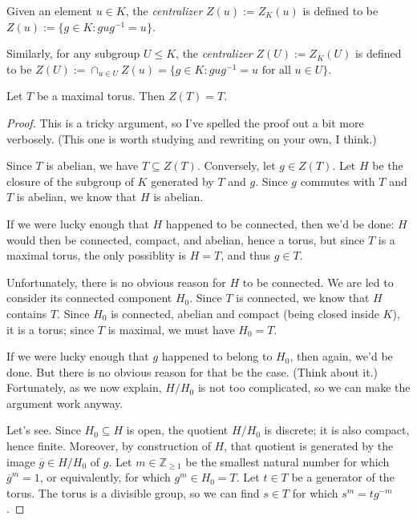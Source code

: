 \documentclass[reqno]{amsart} 
\begin{document}
\begin{definition}
  Given an element $u \in K$, the \emph{centralizer} $Z(u) := Z_K(u)$ is defined to be $Z(u) := \{g \in K : g u g^{-1} = u\}$.

  Similarly, for any subgroup $U \leq K$, the \emph{centralizer} $Z(U) := Z_K(U)$ is defined to be $Z(U) := \cap_{u \in U} Z(u) = \{g \in K : g u g^{-1} = u \text{ for all } u \in U\}$.
\end{definition}

\begin{lemma}
  Let $T$ be a maximal torus.  Then $Z(T) = T$.
\end{lemma}
\begin{proof}
  This is a tricky argument, so I've spelled the proof out a bit more verbosely.  (This one is worth studying and rewriting on your own, I think.)

  Since $T$ is abelian, we have $T \subseteq Z(T)$.  Conversely, let $g \in Z(T)$.  Let $H$ be the closure of the subgroup of $K$ generated by $T$ and $g$.  Since $g$ commutes with $T$ and $T$ is abelian, we know that $H$ is abelian.

  If we were lucky enough that $H$ happened to be connected, then we'd be done: $H$ would then be connected, compact, and abelian, hence a torus, but since $T$ is a maximal torus, the only possiblity is $H = T$, and thus $g \in T$.

  Unfortunately, there is no obvious reason for $H$ to be connected.  We are led to consider its connected component $H_0$.  Since $T$ is connected, we know that $H$ contains $T$.  Since $H_0$ is connected, abelian and compact (being closed inside $K$), it is a torus; since $T$ is maximal, we must have $H_0 = T$.

  If we were lucky enough that $g$ happened to belong to $H_0$, then again, we'd be done.  But there is no obvious reason for that be the case.  (Think about it.)  Fortunately, as we now explain, $H/H_0$ is not too complicated, so we can make the argument work anyway.

  Let's see.  Since $H_0 \subseteq H$ is open, the quotient $H/H_0$ is discrete; it is also compact, hence finite.  Moreover, by construction of $H$, that quotient is generated by the image $\overline{g} \in H/H_0$ of $g$.  Let $m \in \mathbb{Z}_{\geq 1}$ be the smallest natural number for which $\overline{g}^m = 1$, or equivalently, for which $g^m \in H_0 = T$.  Let $t \in T$ be a generator of the torus.  The torus is a divisible group, so we can find $s \in T$ for which $s^m = t g^{-m}$.


\end{proof}
\end{document}
